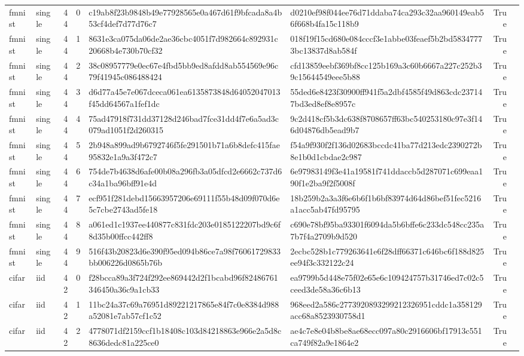 \begin{tabular}{llrrllrl}
fmnist & single & 44 & 0 & c19ab8f23b9848b49e77928565e0a467d61f9bfcada8a4b53cf4def7d77d76c7 & d0210ef98f044ee76d71ddaba74ca293c32aa960149eab56f668b4fa15c118b9 & True &  \\
fmnist & single & 44 & 1 & 8631e3ca075da06de2ae36cbc4051f7d982664c892931c20668b4e730b70cf32 & 018f19f15cd680e084cccf3e1abbe03feaef5b2bd58347773bc13837d8ab584f & True &  \\
fmnist & single & 44 & 2 & 38c08957779e0ec67e4fbd5bb9ed8afdd8ab554569e96c79f41945c086488424 & cfd13859eebf369bf8cc125b169a3c60b6667a227c252b39c15644549eee5b88 & True &  \\
fmnist & single & 44 & 3 & d6d77a45e7e067dceca061ea6135873848d64052047013f45dd64567a1fef1dc & 55ded6e8423f30900ff941f5a2dbf4585f49d863cdc237147bd3ed8ef8e8957c & True &  \\
fmnist & single & 44 & 4 & 75ad47918f731dd37128d246bad7fce31dd4f7e6a5ad3c079ad1051f2d260315 & 9c2d418cf5b3dc638f8708657ff63bc540253180c97e3f146d04876db5ead9b7 & True &  \\
fmnist & single & 44 & 5 & 2b948a899ad9b6792746f5fe291501b71a6b8defc415fae95832e1a9a3f472c7 & f54a9f930f2f136d02683bccdc41ba77d213edc2390272b8e1b0d1cbdae2c987 & True &  \\
fmnist & single & 44 & 6 & 754de7b4638d6afe00b08a296fb3a05dfcd2e6662c737d6c34a1ba96bff91e4d & 6e97983149f3e41a19581f741ddaccb5d287071c699eaa190f1e2ba9f2f5008f & True &  \\
fmnist & single & 44 & 7 & ecf951f281debd15663957206e69111f55b48d09f070d6e5c7cbe2743ad5fe18 & 18b259b2a3a3f6e6b6f1b6bf83974d64d86bef51fec5216a1acc5ab47fd95795 & True &  \\
fmnist & single & 44 & 8 & a061ed1c1937ee440877c831fdc203e0185122207bd9c6f8d35b00ffcc442ff8 & c690e78bf95ba93301f6094da5b6bffe6c233dc548cc235a7b7f4a2709b9d520 & True &  \\
fmnist & single & 44 & 9 & 516f43b20823d6e390f95ed094b86ce7a98f76061729833bb006226d0865b76b & 2ecbc528b1c779263641e6f28dff66371c646bc6f188d825ee94f3c332122c24 & True &  \\
cifar & iid & 42 & 0 & f28bcca89a3f724f292ee869442d2f1bcabd96f82486761346450a36c9a1cb33 & ea9799b5d448e75f02e65e6c109424757b31746ed7c02c5ceed3de58a36c6b13 & True &  \\
cifar & iid & 42 & 1 & 11bc24a37c69a76951d89221217865e84f7c0e8384d988a52081e7ab57cf1c52 & 968eed2a586c2773920893299212326951cddc1a358129acc68a8523930758d1 & True &  \\
cifar & iid & 42 & 2 & 4778071df2159ccf1b18408c103d84218863e966e2a5d8c8636dedc81a225ce0 & ae4c7e8e04b8be8ae68ecc097a80c2916606bf17913c551ca749f82a9e1864e2 & True &  \\

\end{tabular}

